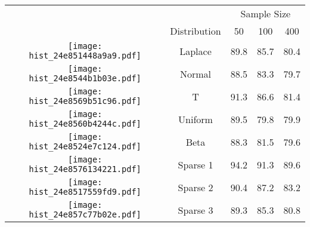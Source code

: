 
\begin{tabular}[t]{>{}ccccc}
\toprule
\multicolumn{2}{c}{  } & \multicolumn{3}{c}{Sample Size} \\
\cmidrule(l{3pt}r{3pt}){3-5}
  & Distribution & 50 & 100 & 400\\
\midrule
\texttt{[image: hist\_24e851448a9a9.pdf]} & Laplace & 89.8 & 85.7 & 80.4\\
\texttt{[image: hist\_24e8544b1b03e.pdf]} & Normal & 88.5 & 83.3 & 79.7\\
\texttt{[image: hist\_24e8569b51c96.pdf]} & T & 91.3 & 86.6 & 81.4\\
\texttt{[image: hist\_24e8560b4244c.pdf]} & Uniform & 89.5 & 79.8 & 79.9\\
\texttt{[image: hist\_24e8524e7c124.pdf]} & Beta & 88.3 & 81.5 & 79.6\\
\texttt{[image: hist\_24e8576134221.pdf]} & Sparse 1 & 94.2 & 91.3 & 89.6\\
\texttt{[image: hist\_24e8517559fd9.pdf]} & Sparse 2 & 90.4 & 87.2 & 83.2\\
\texttt{[image: hist\_24e857c77b02e.pdf]} & Sparse 3 & 89.3 & 85.3 & 80.8\\
\bottomrule
\end{tabular}
